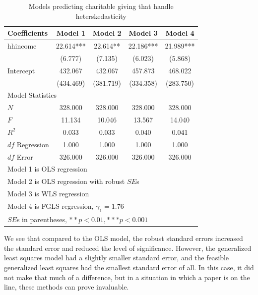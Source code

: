 \begin{table}[htbp]\centering
\caption{Models predicting charitable giving that handle heterskedasticity
\label{tab:charityhet}}
\begin{tabular}{lcccc}
\hline
Coefficients&   Model 1  &   Model 2  &     Model 3  &    Model 4  \\
\hline
hhincome  &   22.614***&   22.614** &   22.186***&   21.989***\\
      &   (6.777)  &   (7.135)  &   (6.023)  &   (5.868)  \\
Intercept  &   432.067  &   432.067  &   457.873  &   468.022  \\
      &  (434.469)  &  (381.719)  &  (334.358)  &  (283.750)  \\
\hline
\multicolumn{5}{l}{Model Statistics} \\
\hline
$N$ &   328.000  &   328.000  &   328.000  &   328.000  \\
$F$  &   11.134  &   10.046  &   13.567  &   14.040  \\
$R^2$ &    0.033  &    0.033  &    0.040  &    0.041  \\
$df$ Regression &    1.000  &    1.000  &    1.000  &    1.000  \\
$df$ Error 				 &   326.000  &   326.000  &   326.000  &   326.000  \\
\hline
\multicolumn{5}{l}{Model 1 is OLS regression} \\
\multicolumn{5}{l}{Model 2 is OLS regression with robust $SE$s} \\
\multicolumn{5}{l}{Model 3 is WLS regression} \\
\multicolumn{5}{l}{Model 4 is FGLS regression, $\gamma_1 = 1.76$} \\
\multicolumn{5}{l}{$SE$s in parentheses, $** p < 0.01, ***p<0.001$} \\
\hline
\end{tabular}
\end{table}
We see that compared to the OLS model, the robust standard errors increased the standard error and reduced the level of significance. However, the generalized least squares model had a slightly smaller standard error, and the feasible generalized least squares had the smallest standard error of all. In this case, it did not make that much of a difference, but in a situation in which a paper is on the line, these methods can prove invaluable.

